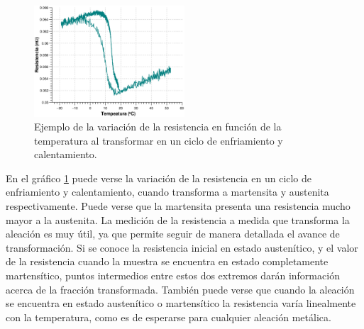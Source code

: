 \documentclass[a4paper,12pt,fleqn,twoside,openany]{book}
\begin{document}
\begin{figure}[h]
 \centering
 \includegraphics[width=0.5\textwidth]{Img/Resultados/RvsTClavo5.eps}
 \caption{Ejemplo de la variación de la resistencia en función de la temperatura al transformar en un ciclo de enfriamiento y calentamiento.} 
 \label{fig:RvsTClavo5}
 \end{figure}

En el gráfico \ref{fig:RvsTClavo5} puede verse la variación de la resistencia en un ciclo de enfriamiento y calentamiento, cuando transforma a martensita y austenita respectivamente. Puede verse que la martensita presenta una resistencia mucho mayor a la austenita. La medición de la resistencia a medida que transforma la aleación es muy útil, ya que permite seguir 
de manera detallada el avance de transformación. Si se conoce la resistencia inicial en estado austenítico, y el valor de la resistencia cuando la 
muestra se encuentra en estado completamente martensítico, puntos intermedios entre estos dos extremos darán información acerca de la fracción transformada.
También puede verse que cuando la aleación se encuentra en estado austenítico o martensítico la resistencia varía linealmente con la temperatura, como es 
de esperarse para cualquier aleación metálica. 

% 


\end{document}
